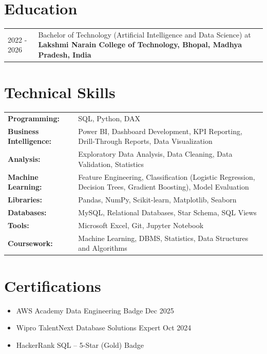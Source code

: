 \documentclass[a4paper,10pt]{article}
\begin{document}
\section{Education}
\begin{tabularx}{\linewidth}{@{}l X@{}}
2022 - 2026 & Bachelor of Technology (Artificial Intelligence and Data Science) at \textbf{Lakshmi Narain College of Technology, Bhopal, Madhya Pradesh, India} \\
\end{tabularx}

\section{Technical Skills}
\begin{tabularx}{\linewidth}{@{}l X@{}}
\textbf{Programming:} & SQL, Python, DAX \\
\textbf{Business Intelligence:} & Power BI, Dashboard Development, KPI Reporting, Drill-Through Reports, Data Visualization \\
\textbf{Analysis:} & Exploratory Data Analysis, Data Cleaning, Data Validation, Statistics \\
\textbf{Machine Learning:} & Feature Engineering, Classification (Logistic Regression, Decision Trees, Gradient Boosting), Model Evaluation \\
\textbf{Libraries:} & Pandas, NumPy, Scikit-learn, Matplotlib, Seaborn \\
\textbf{Databases:} & MySQL, Relational Databases, Star Schema, SQL Views \\
\textbf{Tools:} & Microsoft Excel, Git, Jupyter Notebook \\
\textbf{Coursework:} & Machine Learning, DBMS, Statistics, Data Structures and Algorithms \\
\end{tabularx}

\section{Certifications}
\begin{itemize}[leftmargin=1em, itemsep=1pt, label=--, nosep]
    \item AWS Academy Data Engineering Badge \hfill Dec 2025
    \item Wipro TalentNext Database Solutions Expert \hfill Oct 2024
    \item HackerRank SQL -- 5-Star (Gold) Badge
\end{itemize}
\end{document}
